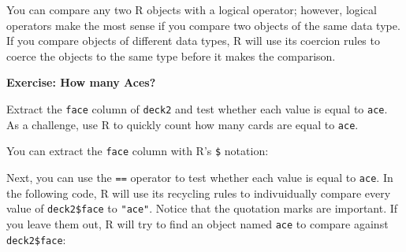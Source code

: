 \documentclass[
  letterpaper,
  DIV=11,
  numbers=noendperiod]{scrbook}
\newenvironment{Shaded}{\begin{snugshade}}{\end{snugshade}}
\newcommand{\DocumentationTok}[1]{\textcolor[rgb]{0.37,0.37,0.37}{\textit{#1}}}
\newcommand{\NormalTok}[1]{\textcolor[rgb]{0.00,0.23,0.31}{#1}}
\newcommand{\SpecialCharTok}[1]{\textcolor[rgb]{0.37,0.37,0.37}{#1}}
\begin{document}
You can compare any two R objects with a logical operator; however,
logical operators make the most sense if you compare two objects of the
same data type. If you compare objects of different data types, R will
use its coercion rules to coerce the objects to the same type before it
makes the comparison.

\begin{tcolorbox}[enhanced jigsaw, left=2mm, breakable, colback=white, colframe=quarto-callout-color-frame, leftrule=.75mm, bottomrule=.15mm, arc=.35mm, opacityback=0, rightrule=.15mm, toprule=.15mm]

\vspace{-3mm}\textbf{Exercise: How many Aces?}\vspace{3mm}

Extract the \texttt{face} column of \texttt{deck2} and test whether each
value is equal to \texttt{ace}. As a challenge, use R to quickly count
how many cards are equal to \texttt{ace}.

\end{tcolorbox}

You can extract the \texttt{face} column with R's \texttt{\$} notation:

\begin{Shaded}
\end{Shaded}

Next, you can use the \texttt{==} operator to test whether each value is
equal to \texttt{ace}. In the following code, R will use its recycling
rules to indivuidually compare every value of \texttt{deck2\$face} to
\texttt{"ace"}. Notice that the quotation marks are important. If you
leave them out, R will try to find an object named \texttt{ace} to
compare against \texttt{deck2\$face}:
\end{document}
